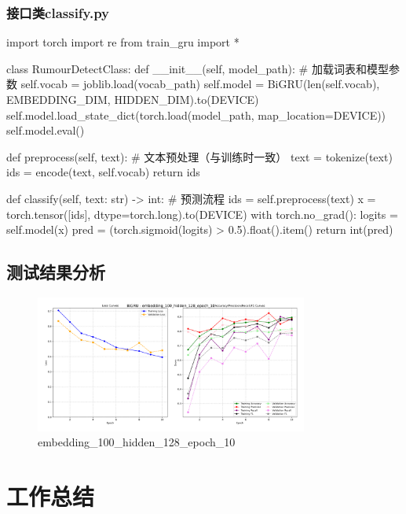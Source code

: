 \subsection{接口类classify.py}
\begin{codeblock}[language=Python]
import torch
import re
from train_gru import *

class RumourDetectClass:
    def __init__(self, model_path):
        # 加载词表和模型参数
        self.vocab = joblib.load(vocab_path)
        self.model = BiGRU(len(self.vocab), EMBEDDING_DIM, HIDDEN_DIM).to(DEVICE)
        self.model.load_state_dict(torch.load(model_path, map_location=DEVICE))
        self.model.eval()

    def preprocess(self, text):
        # 文本预处理（与训练时一致）
        text = tokenize(text)
        ids = encode(text, self.vocab)
        return ids
    
    def classify(self, text: str) -> int:
        # 预测流程
        ids = self.preprocess(text)
        x = torch.tensor([ids], dtype=torch.long).to(DEVICE)
        with torch.no_grad():
            logits = self.model(x)
            pred = (torch.sigmoid(logits) > 0.5).float().item()
        return int(pred)
\end{codeblock}

\section{测试结果分析}


\begin{figure}[ht]
  \centering
  \includegraphics[width=0.8\textwidth]{../Output/Graph/embedding_100_hidden_128_epoch_10.png}
  \caption{embedding\_100\_hidden\_128\_epoch\_10}
\end{figure}




\chapter{工作总结}

